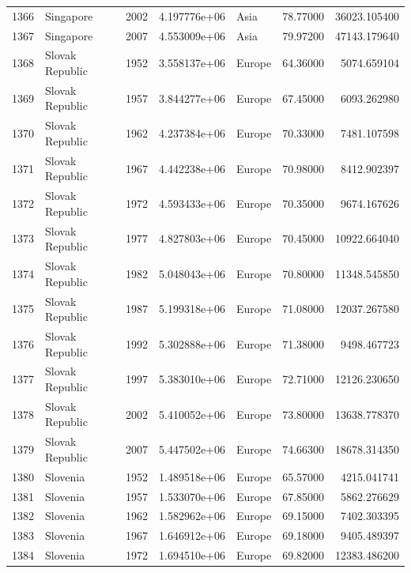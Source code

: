 \documentclass[
  letterpaper,
  DIV=11,
  numbers=noendperiod]{scrreprt}
\begin{document}
\begin{tabular}{llrrlrr}
1366 &                 Singapore &  2002 &  4.197776e+06 &      Asia &  78.77000 &   36023.105400 \\
1367 &                 Singapore &  2007 &  4.553009e+06 &      Asia &  79.97200 &   47143.179640 \\
1368 &           Slovak Republic &  1952 &  3.558137e+06 &    Europe &  64.36000 &    5074.659104 \\
1369 &           Slovak Republic &  1957 &  3.844277e+06 &    Europe &  67.45000 &    6093.262980 \\
1370 &           Slovak Republic &  1962 &  4.237384e+06 &    Europe &  70.33000 &    7481.107598 \\
1371 &           Slovak Republic &  1967 &  4.442238e+06 &    Europe &  70.98000 &    8412.902397 \\
1372 &           Slovak Republic &  1972 &  4.593433e+06 &    Europe &  70.35000 &    9674.167626 \\
1373 &           Slovak Republic &  1977 &  4.827803e+06 &    Europe &  70.45000 &   10922.664040 \\
1374 &           Slovak Republic &  1982 &  5.048043e+06 &    Europe &  70.80000 &   11348.545850 \\
1375 &           Slovak Republic &  1987 &  5.199318e+06 &    Europe &  71.08000 &   12037.267580 \\
1376 &           Slovak Republic &  1992 &  5.302888e+06 &    Europe &  71.38000 &    9498.467723 \\
1377 &           Slovak Republic &  1997 &  5.383010e+06 &    Europe &  72.71000 &   12126.230650 \\
1378 &           Slovak Republic &  2002 &  5.410052e+06 &    Europe &  73.80000 &   13638.778370 \\
1379 &           Slovak Republic &  2007 &  5.447502e+06 &    Europe &  74.66300 &   18678.314350 \\
1380 &                  Slovenia &  1952 &  1.489518e+06 &    Europe &  65.57000 &    4215.041741 \\
1381 &                  Slovenia &  1957 &  1.533070e+06 &    Europe &  67.85000 &    5862.276629 \\
1382 &                  Slovenia &  1962 &  1.582962e+06 &    Europe &  69.15000 &    7402.303395 \\
1383 &                  Slovenia &  1967 &  1.646912e+06 &    Europe &  69.18000 &    9405.489397 \\
1384 &                  Slovenia &  1972 &  1.694510e+06 &    Europe &  69.82000 &   12383.486200 \\

\end{tabular}
\end{document}
